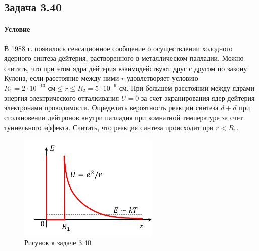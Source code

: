 \documentclass[12pt]{article}
\begin{document}
\subsection{Задача 3.40}
\label{task_3.40}
\paragraph{Условие}
В 1988 г. появилось сенсационное сообщение о осуществлении холодного ядерного синтеза дейтерия, растворенного в металлическом палладии. Можно считать, что при этом ядра дейтерия взаимодействуют друг с другом по закону Кулона, если расстояние между ними $r$ удовлетворяет условию $R_1 = 2\cdot 10^{-13} \text{ см} \le r \le  R_2 = 5\cdot 10^{-9} \text{ см}$. При большем расстоянии между ядрами энергия электрического отталкивания $U=0$ за счет экранирования ядер дейтерия электронами проводимости. Определить вероятность реакции синтеза $d+d$\; при столкновении дейтронов внутри палладия при комнатной температуре за счет туннельного эффекта. Считать, что реакция синтеза происходит при $r<R_1$.
\begin{figure}[h]
    \centering
    \includegraphics[width=0.6\textwidth,height=\textheight,keepaspectratio]{Seminar_04/pics/pic_06.pdf}
    \caption{Рисунок к задаче 3.40}
\end{figure}
\end{document}
